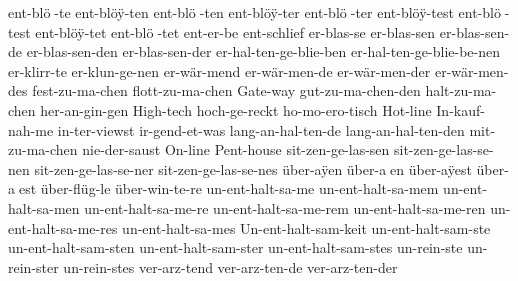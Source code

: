 {  ent-bl^^f6^^Y-te
  ent-bl^^f6^^ff-ten %
  ent-bl^^f6^^Y-ten
  ent-bl^^f6^^ff-ter %
  ent-bl^^f6^^Y-ter
  ent-bl^^f6^^ff-test %
  ent-bl^^f6^^Y-test
  ent-bl^^f6^^ff-tet %
  ent-bl^^f6^^Y-tet
  ent-er-be %
  ent-schlief %
  er-blas-se %
  er-blas-sen %
  er-blas-sen-de %
  er-blas-sen-den %
  er-blas-sen-der %
  er-hal-ten-ge-blie-ben %
  er-hal-ten-ge-blie-be-nen %
  er-klirr-te %
  er-klun-ge-nen %
  er-w^^e4r-mend %
  er-w^^e4r-men-de %
  er-w^^e4r-men-der %
  er-w^^e4r-men-des %
  fest-zu-ma-chen %
  flott-zu-ma-chen %
  Gate-way %
  gut-zu-ma-chen-den %
  halt-zu-ma-chen %
  her-an-gin-gen %
  High-tech %
  hoch-ge-reckt %
  ho-mo-ero-tisch %
  Hot-line %
  In-kauf-nah-me %
  in-ter-viewst %
  ir-gend-et-was %
  lang-an-hal-ten-de %
  lang-an-hal-ten-den %
  mit-zu-ma-chen %
  nie-der-saust %
  On-line %
  Pent-house %
  sit-zen-ge-las-sen %
  sit-zen-ge-las-se-nen %
  sit-zen-ge-las-se-ner %
  sit-zen-ge-las-se-nes %
  ^^fcber-a^^ffen %
  ^^fcber-a^^Yen
  ^^fcber-a^^ffest %
  ^^fcber-a^^Yest
  ^^fcber-fl^^fcg-le %
  ^^fcber-win-te-re %
  un-ent-halt-sa-me %
  un-ent-halt-sa-mem %
  un-ent-halt-sa-men %
  un-ent-halt-sa-me-re %
  un-ent-halt-sa-me-rem %
  un-ent-halt-sa-me-ren %
  un-ent-halt-sa-me-res %
  un-ent-halt-sa-mes %
  Un-ent-halt-sam-keit %
  un-ent-halt-sam-ste %
  un-ent-halt-sam-sten %
  un-ent-halt-sam-ster %
  un-ent-halt-sam-stes %
  un-rein-ste %
  un-rein-ster %
  un-rein-stes %
  ver-arz-tend %
  ver-arz-ten-de %
  ver-arz-ten-der %
}

